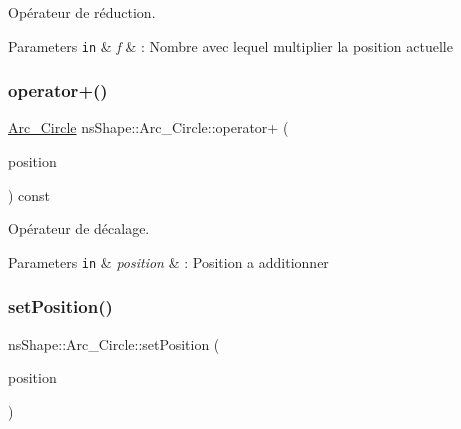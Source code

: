 Opérateur de réduction. 


\begin{DoxyParams}[1]{Parameters}
\mbox{\tt in}  & {\em f} & \+: Nombre avec lequel multiplier la position actuelle \\
\hline
\end{DoxyParams}
\mbox{\label{classns_shape_1_1_arc___circle_ac29fef537e801cbf80c148452772c770}} 
\subsubsection{\texorpdfstring{operator+()}{operator+()}}
{\footnotesize\ttfamily \hyperlink{classns_shape_1_1_arc___circle}{Arc\+\_\+\+Circle} ns\+Shape\+::\+Arc\+\_\+\+Circle\+::operator+ (\begin{DoxyParamCaption}\item[{const \hyperlink{classns_graphics_1_1_vec2_d}{ns\+Graphics\+::\+Vec2D} \&}]{position }\end{DoxyParamCaption}) const}



Opérateur de décalage. 


\begin{DoxyParams}[1]{Parameters}
\mbox{\tt in}  & {\em position} & \+: Position a additionner \\
\hline
\end{DoxyParams}
\mbox{\label{classns_shape_1_1_arc___circle_a52fa998838188e80ff97f96ad514cfe6}} 
\subsubsection{\texorpdfstring{set\+Position()}{setPosition()}}
{\footnotesize\ttfamily ns\+Shape\+::\+Arc\+\_\+\+Circle\+::set\+Position (\begin{DoxyParamCaption}\item[{const \hyperlink{classns_graphics_1_1_vec2_d}{ns\+Graphics\+::\+Vec2D} \&}]{position }\end{DoxyParamCaption})}



